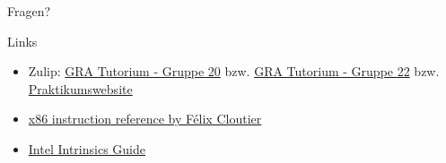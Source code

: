 \documentclass[
  german,            %
  aspectratio=169,    %
]{tumbeamer}
\begin{document}
\begin{frame}[c]{}{}
  \begin{center}
    \LARGE Fragen?
  \end{center}
\end{frame}

\begin{frame}[fragile, c]{Links}{}
  \begin{itemize}
    \item Zulip: \href{https://zulip.in.tum.de/#narrow/stream/2267-GRA-Tutorium---Gruppe-20}{\glqq GRA Tutorium - Gruppe 20\grqq}
          bzw. \href{https://zulip.in.tum.de/#narrow/stream/2269-GRA-Tutorium---Gruppe-22}{\glqq GRA Tutorium - Gruppe 22\grqq}
          bzw. \href{https://gra.caps.in.tum.de}{\glqq Praktikumswebsite\grqq}
    \item \href{https://www.felixcloutier.com/x86/}{x86 instruction reference by Félix Cloutier}
    \item \href{https://www.intel.com/content/www/us/en/docs/intrinsics-guide/index.html#}{Intel Intrinsics Guide}
  \end{itemize}
\end{frame}

\maketitle
\end{document}
